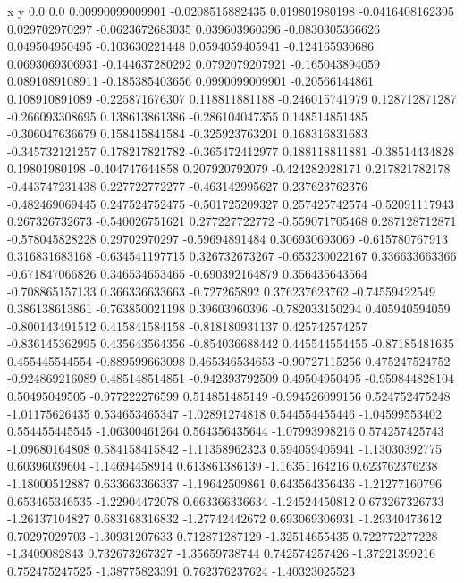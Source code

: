               x                y
            0.0              0.0
0.00990099009901  -0.0208515882435
 0.019801980198  -0.0416408162395
 0.029702970297  -0.0623672683035
 0.039603960396  -0.0830305366626
 0.049504950495  -0.103630221448
0.0594059405941  -0.124165930686
0.0693069306931  -0.144637280292
0.0792079207921  -0.165043894059
0.0891089108911  -0.185385403656
0.0990099009901   -0.20566144861
 0.108910891089  -0.225871676307
 0.118811881188  -0.246015741979
 0.128712871287  -0.266093308695
 0.138613861386  -0.286104047355
 0.148514851485  -0.306047636679
 0.158415841584  -0.325923763201
 0.168316831683  -0.345732121257
 0.178217821782  -0.365472412977
 0.188118811881   -0.38514434828
  0.19801980198  -0.404747644858
 0.207920792079  -0.424282028171
 0.217821782178  -0.443747231438
 0.227722772277  -0.463142995627
 0.237623762376  -0.482469069445
 0.247524752475  -0.501725209327
 0.257425742574   -0.52091117943
 0.267326732673  -0.540026751621
 0.277227722772  -0.559071705468
 0.287128712871  -0.578045828228
  0.29702970297   -0.59694891484
 0.306930693069  -0.615780767913
 0.316831683168  -0.634541197715
 0.326732673267  -0.653230022167
 0.336633663366  -0.671847066826
 0.346534653465  -0.690392164879
 0.356435643564  -0.708865157133
 0.366336633663     -0.727265892
 0.376237623762   -0.74559422549
 0.386138613861  -0.763850021198
  0.39603960396  -0.782033150294
 0.405940594059  -0.800143491512
 0.415841584158  -0.818180931137
 0.425742574257  -0.836145362995
 0.435643564356  -0.854036688442
 0.445544554455   -0.87185481635
 0.455445544554  -0.889599663098
 0.465346534653   -0.90727115256
 0.475247524752  -0.924869216089
 0.485148514851  -0.942393792509
  0.49504950495  -0.959844828104
  0.50495049505  -0.977222276599
 0.514851485149  -0.994526099156
 0.524752475248   -1.01175626435
 0.534653465347   -1.02891274818
 0.544554455446   -1.04599553402
 0.554455445545   -1.06300461264
 0.564356435644   -1.07993998216
 0.574257425743   -1.09680164808
 0.584158415842   -1.11358962323
 0.594059405941   -1.13030392775
  0.60396039604   -1.14694458914
 0.613861386139   -1.16351164216
 0.623762376238   -1.18000512887
 0.633663366337   -1.19642509861
 0.643564356436   -1.21277160796
 0.653465346535   -1.22904472078
 0.663366336634   -1.24524450812
 0.673267326733   -1.26137104827
 0.683168316832   -1.27742442672
 0.693069306931   -1.29340473612
  0.70297029703   -1.30931207633
 0.712871287129   -1.32514655435
 0.722772277228    -1.3409082843
 0.732673267327   -1.35659738744
 0.742574257426   -1.37221399216
 0.752475247525   -1.38775823391
 0.762376237624   -1.40323025523
